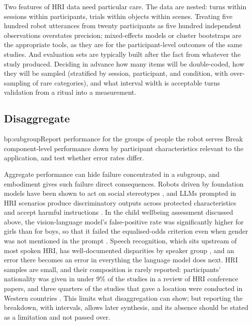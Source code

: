 Two features of HRI data need particular care. The data are nested: turns
within sessions within participants, trials within objects within scenes.
Treating five hundred robot utterances from twenty participants as five
hundred independent observations overstates precision; mixed-effects models
or cluster bootstraps are the appropriate tools, as they are for the
participant-level outcomes of the same studies. And evaluation sets are
typically built after the fact from whatever the study produced. Deciding in
advance how many items will be double-coded, how they will be sampled
(stratified by session, participant, and condition, with over-sampling of rare
categories), and what interval width is acceptable turns validation from a
ritual into a measurement.

\subsection{Disaggregate}

\begin{practice}{bp:subgroup}{Report performance for the groups of people the robot serves}
Break component-level performance down by participant characteristics
relevant to the application, and test whether error rates differ.
\end{practice}

Aggregate performance can hide failure concentrated in a subgroup, and
embodiment gives such failure direct consequences. Robots driven by
foundation models have been shown to act on social stereotypes
\cite{hundt2022robots}, and LLMs prompted in HRI scenarios produce
discriminatory outputs across protected characteristics and accept harmful
instructions \cite{hundt2025llm}. In the child wellbeing assessment discussed
above, the vision-language model's false-positive rate was significantly
higher for girls than for boys, so that it failed the equalised-odds criterion
even when gender was not mentioned in the prompt \cite{abbasi2025robotled}.
Speech recognition, which sits upstream of most spoken HRI, has well-documented
disparities by speaker group \cite{koenecke2020racial}, and an error there
becomes an error in everything the language model does next. HRI samples are
small, and their composition is rarely reported: participants' nationality
was given in under 9\% of the studies in a review of HRI conference papers,
and three quarters of the studies that gave a location were conducted in
Western countries \cite{seaborn2023not}. This limits what
disaggregation can show; but reporting the breakdown, with intervals, allows
later synthesis, and its absence should be stated as a limitation and not
passed over.

